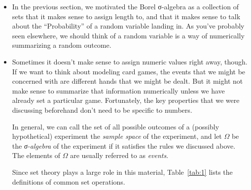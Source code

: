 \begin{itemize}

\item In the previous section, we motivated the Borel σ-algebra as a
  collection of sets that it makes sense to assign length to, and that
  it makes sense to talk about the ``Probability'' of a random
  variable landing in.  As you've probably seen elsewhere, we should
  think of a random variable is a way of numerically summarizing a
  random outcome.

\item Sometimes it doesn't make sense to assign numeric values right
  away, though.  If we want to think about modeling card games, the
  events that we might be concerned with are different hands that we
  might be dealt.  But it might not make sense to summarize that
  information numerically unless we have already set a particular
  game.  Fortunately, the key properties that we were discussing
  beforehand don't need to be specific to numbers.

  In general, we can call the set of all possible outcomes of a
  (possibly hypothetical) experiment the \emph{sample space} of the
  experiment, and let $Ω$ be the \emph{σ-algebra} of the experiment if
  it satisfies the rules we discussed above.  The elements of $Ω$ are
  usually referred to as \emph{events}.

  Since set theory plays a large role in this material,
  Table~\ref{tab:1} lists the definitions of common set operations.


\end{itemize}
